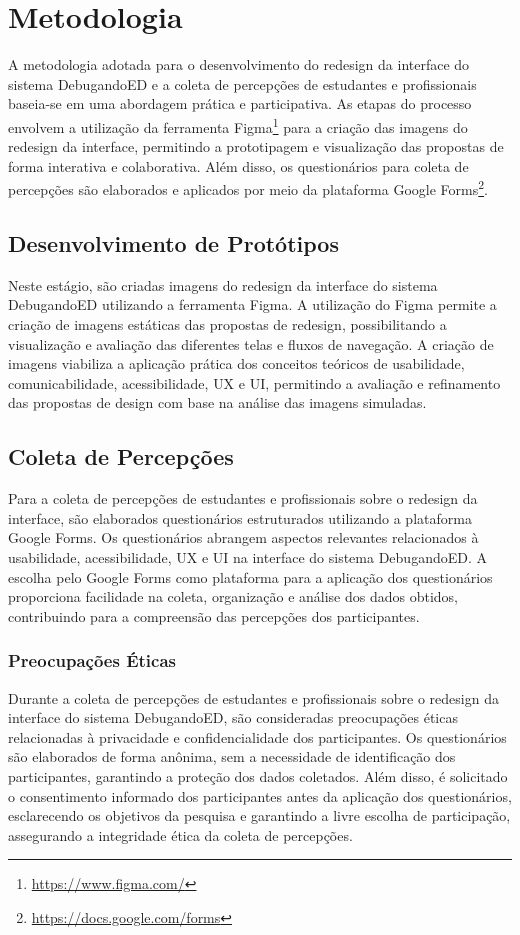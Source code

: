 \chapter[Metodologia]{Metodologia}
\label{capMeto}

A metodologia adotada para o desenvolvimento do redesign da interface do sistema DebugandoED e a coleta de percepções de estudantes e profissionais baseia-se em uma abordagem prática e participativa. As etapas do processo envolvem a utilização da ferramenta Figma\footnote{\url{https://www.figma.com/}} para a criação das imagens do redesign da interface, permitindo a prototipagem e visualização das propostas de forma interativa e colaborativa. Além disso, os questionários para coleta de percepções são elaborados e aplicados por meio da plataforma Google Forms\footnote{\url{https://docs.google.com/forms}}.


\section{Desenvolvimento de Protótipos}

Neste estágio, são criadas imagens do redesign da interface do sistema DebugandoED utilizando a ferramenta Figma. A utilização do Figma permite a criação de imagens estáticas das propostas de redesign, possibilitando a visualização e avaliação das diferentes telas e fluxos de navegação. A criação de imagens viabiliza a aplicação prática dos conceitos teóricos de usabilidade, comunicabilidade, acessibilidade, \ac{UX} e \ac{UI}, permitindo a avaliação e refinamento das propostas de design com base na análise das imagens simuladas.

\section{Coleta de Percepções}

Para a coleta de percepções de estudantes e profissionais sobre o redesign da interface, são elaborados questionários estruturados utilizando a plataforma Google Forms. Os questionários abrangem aspectos relevantes relacionados à usabilidade, acessibilidade,  \ac{UX} e \ac{UI} na interface do sistema DebugandoED. A escolha pelo Google Forms como plataforma para a aplicação dos questionários proporciona facilidade na coleta, organização e análise dos dados obtidos, contribuindo para a compreensão das percepções dos participantes.

\subsection{Preocupações Éticas}

Durante a coleta de percepções de estudantes e profissionais sobre o redesign da interface do sistema DebugandoED, são consideradas preocupações éticas relacionadas à privacidade e confidencialidade dos participantes. Os questionários são elaborados de forma anônima, sem a necessidade de identificação dos participantes, garantindo a proteção dos dados coletados. Além disso, é solicitado o consentimento informado dos participantes antes da aplicação dos questionários, esclarecendo os objetivos da pesquisa e garantindo a livre escolha de participação, assegurando a integridade ética da coleta de percepções.
